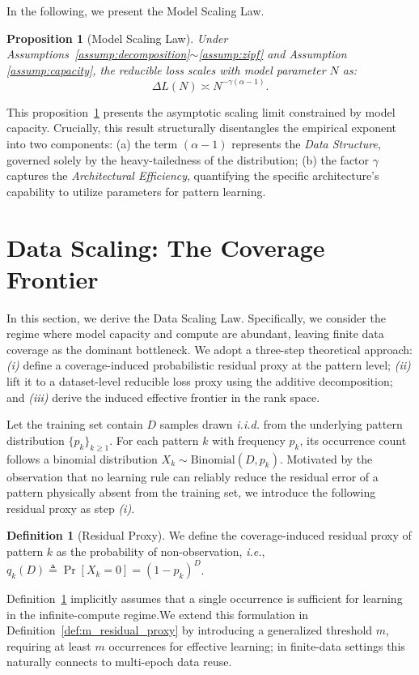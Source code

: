 \documentclass{article}
\theoremstyle{plain}
\newtheorem{proposition}[theorem]{Proposition}
\theoremstyle{definition}
\newtheorem{definition}[theorem]{Definition}
\theoremstyle{remark}
\begin{document}
In the following, we present the Model Scaling Law.
\begin{proposition}[Model Scaling Law]
\label{prop:model_scaling}
    Under Assumptions~\ref{assump:decomposition}$\sim$\ref{assump:zipf} and Assumption \ref{assump:capacity}, the reducible loss scales with model parameter $N$ as:
    \begin{equation*}
        \boxed{\Delta L(N) \asymp N^{-\gamma(\alpha-1)}.}
    \end{equation*}
\end{proposition}
This proposition~\ref{prop:model_scaling} presents the asymptotic scaling limit constrained by model capacity.
Crucially, this result structurally disentangles the empirical exponent into two components: (a) the term $(\alpha-1)$ represents the \textit{Data Structure}, governed solely by the heavy-tailedness of the distribution; (b) the factor $\gamma$ captures the \textit{Architectural Efficiency}, quantifying the specific architecture's capability to utilize parameters for pattern learning.




\section{Data Scaling: The Coverage Frontier}
\label{subsec:data_scaling}
In this section, we derive the Data Scaling Law.
Specifically, we consider the regime where model capacity and compute are abundant, leaving finite data coverage as the dominant bottleneck.
We adopt a three-step theoretical approach: 
\textit{(i)} define a coverage-induced probabilistic residual proxy at the pattern level;
\textit{ (ii)} lift it to a dataset-level reducible loss proxy using the additive decomposition; 
and \textit{(iii)} derive the induced effective frontier in the rank space.


Let the training set contain $D$ samples drawn \textit{i.i.d.} from the underlying pattern distribution $\{p_k\}_{k\ge 1}$. 
For each pattern $k$ with frequency $p_k$, its occurrence count follows a binomial distribution $X_k \sim \mathrm{Binomial}(D,p_k)$.
Motivated by the observation that no learning rule can reliably reduce the residual error of a pattern physically absent from the training set, we introduce the following residual proxy as step \textit{(i)}.


\begin{definition}[Residual Proxy]
    \label{def:residual_proxy}
    We define the coverage-induced residual proxy of pattern $k$ as the probability of non-observation, \textit{i.e.}, $q_k(D) \triangleq \Pr[X_k=0] = (1-p_k)^D$. 
\end{definition}
Definition~\ref{def:residual_proxy} implicitly assumes that a single occurrence is sufficient for learning in the infinite-compute regime.We extend this formulation in Definition~\ref{def:m_residual_proxy} by introducing a generalized threshold $m$, requiring at least $m$ occurrences for effective learning; in finite-data settings this naturally connects to multi-epoch data reuse. \citep{yan2025largerdatasetsrepeatedmore}
\end{document}
